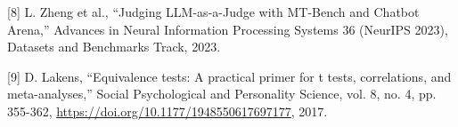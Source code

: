 \documentclass[10pt,a4paper,twocolumn]{article}
\begin{document}
{\noindent\hangindent=0.5cm
[8] L. Zheng et al., ``Judging LLM-as-a-Judge with MT-Bench and Chatbot Arena,'' Advances in Neural Information Processing Systems 36 (NeurIPS 2023), Datasets and Benchmarks Track, 2023.
\par\vspace{0pt}

\noindent\hangindent=0.5cm
[9] D. Lakens, ``Equivalence tests: A practical primer for t tests, correlations, and meta-analyses,'' Social Psychological and Personality Science, vol. 8, no. 4, pp. 355-362, \url{https://doi.org/10.1177/1948550617697177}, 2017.
\par
}
\end{document}
